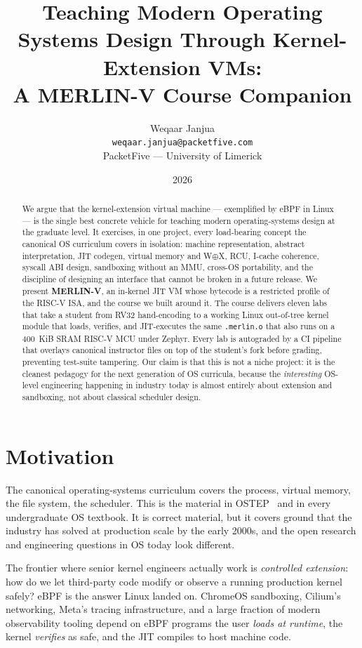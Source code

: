 \documentclass[11pt,a4paper]{article}
\title{Teaching Modern Operating Systems Design Through Kernel-Extension VMs:\\
       A MERLIN-V Course Companion}
\author{Weqaar Janjua\\
        \texttt{weqaar.janjua@packetfive.com}\\
        PacketFive --- University of Limerick}
\date{2026}
\begin{document}
\maketitle

\begin{abstract}
We argue that the kernel-extension virtual machine ---
exemplified by eBPF in Linux --- is the single best concrete
vehicle for teaching modern operating-systems design at the
graduate level.  It exercises, in one project, every load-bearing
concept the canonical OS curriculum covers in isolation: machine
representation, abstract interpretation, JIT codegen, virtual
memory and W$\oplus$X, RCU, I-cache coherence, syscall ABI design,
sandboxing without an MMU, cross-OS portability, and the
discipline of designing an interface that cannot be broken in a
future release.
We present \textbf{MERLIN-V}, an in-kernel JIT VM whose bytecode
is a restricted profile of the RISC-V ISA, and the course we
built around it.  The course delivers eleven labs that take a
student from RV32 hand-encoding to a working Linux out-of-tree
kernel module that loads, verifies, and JIT-executes the same
\texttt{.merlin.o} that also runs on a 400~KiB SRAM RISC-V MCU
under Zephyr.  Every lab is autograded by a CI pipeline that
overlays canonical instructor files on top of the student's
fork before grading, preventing test-suite tampering.  Our claim
is that this is not a niche project: it is the cleanest pedagogy
for the next generation of OS curricula, because the
\emph{interesting} OS-level engineering happening in industry
today is almost entirely about extension and sandboxing,
not about classical scheduler design.
\end{abstract}

\section{Motivation}
\label{sec:motivation}

The canonical operating-systems curriculum covers the process,
virtual memory, the file system, the scheduler.  This is the
material in OSTEP~\cite{ostep} and in every undergraduate OS
textbook.  It is correct material, but it covers ground that the
industry has solved at production scale by the early 2000s, and
the open research and engineering questions in OS today look
different.

The frontier where senior kernel engineers actually work is
\emph{controlled extension}: how do we let third-party code
modify or observe a running production kernel safely?  eBPF is
the answer Linux landed on.  ChromeOS sandboxing, Cilium's
networking, Meta's tracing infrastructure, and a large fraction
of modern observability tooling depend on eBPF programs the user
\emph{loads at runtime}, the kernel \emph{verifies} as safe, and
the JIT compiles to host machine code.
\end{document}
